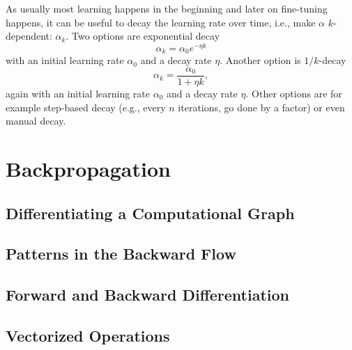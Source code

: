 		As usually most learning happens in the beginning and later on fine-tuning happens, it can be useful to decay the learning rate over time, i.e., make \(\alpha\) \(k\)-dependent: \(\alpha_k\). Two options are exponential decay
		\begin{equation}
			\alpha_k = \alpha_0 e^{-\eta k}
		\end{equation}
		with an initial learning rate \(\alpha_0\) and a decay rate \(\eta\). Another option is \(1/k\)-decay
		\begin{equation}
			\alpha_k = \frac{\alpha_0}{1 + \eta k},
		\end{equation}
		again with an initial learning rate \(\alpha_0\) and a decay rate \(\eta\). Other options are for example step-based decay (e.g., every \(n\) iterations, go done by a factor) or even manual decay.

\chapter{Backpropagation} %
	\label{c:backpropagation}


	\section{Differentiating a Computational Graph} %

	\section{Patterns in the Backward Flow} %

	\section{Forward and Backward Differentiation} %

	\section{Vectorized Operations} %

